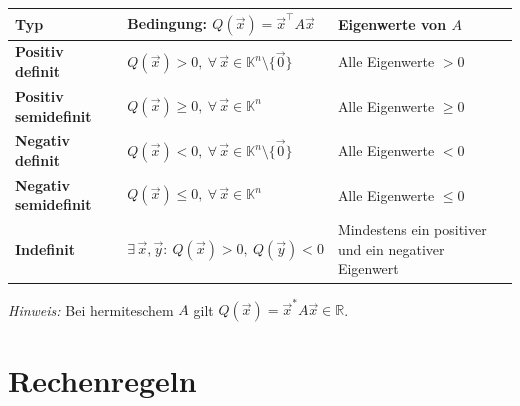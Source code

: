 \documentclass[a4paper,11pt,oneside,open=any,parskip=half, DIV=15]{scrreprt}
\begin{document}
   \begin{importantbox}
   {%
   \renewcommand{\arraystretch}{1.4}%
   \begin{center}
      \begin{tabular}{>{\raggedright\arraybackslash}p{3.5cm}|
                     >{\raggedright\arraybackslash}p{4.8cm}|
                     >{\raggedright\arraybackslash}p{4.8cm}}
         \rowcolor{gray!5}
         \textbf{Typ} & \textbf{Bedingung: \(Q(\vec x)=\vec x^{\top}A\vec x\)} & \textbf{Eigenwerte von \(A\)} \\
         \hline    %
         \rowcolor{green!25}
         \textbf{Positiv definit}
         & \(Q(\vec x) > 0,\ \forall\,\vec x \in \mathbb{K}^n \setminus \{\vec 0\}\)
         & Alle Eigenwerte \(> 0\) \\
         \hline    %
         \rowcolor{green!10}
         \textbf{Positiv semidefinit}
         & \(Q(\vec x) \ge 0,\ \forall\,\vec x \in \mathbb{K}^n\)
         & Alle Eigenwerte \(\ge 0\) \\
         \hline    %
         \rowcolor{red!25}
         \textbf{Negativ definit}
         & \(Q(\vec x) < 0,\ \forall\,\vec x \in \mathbb{K}^n \setminus \{\vec 0\}\)
         & Alle Eigenwerte \(< 0\) \\
         \hline    %
         \rowcolor{red!10}
         \textbf{Negativ semidefinit}
         & \(Q(\vec x) \le 0,\ \forall\,\vec x \in \mathbb{K}^n\)
         & Alle Eigenwerte \(\le 0\) \\
         \hline    %
         \rowcolor{orange!30}
         \textbf{Indefinit}
         & \(\exists\,\vec x,\vec y:\ Q(\vec x) > 0,\ Q(\vec y) < 0\)
         & Mindestens ein positiver und ein negativer Eigenwert \\
         \hline    %
      \end{tabular}
   \end{center}
   }%
   \end{importantbox}

   \noindent\emph{Hinweis:} Bei hermiteschem \(A\) gilt \(Q(\vec x)=\vec x^{*}A\vec x \in \mathbb{R}\).

\section{Rechenregeln}
\end{document}
